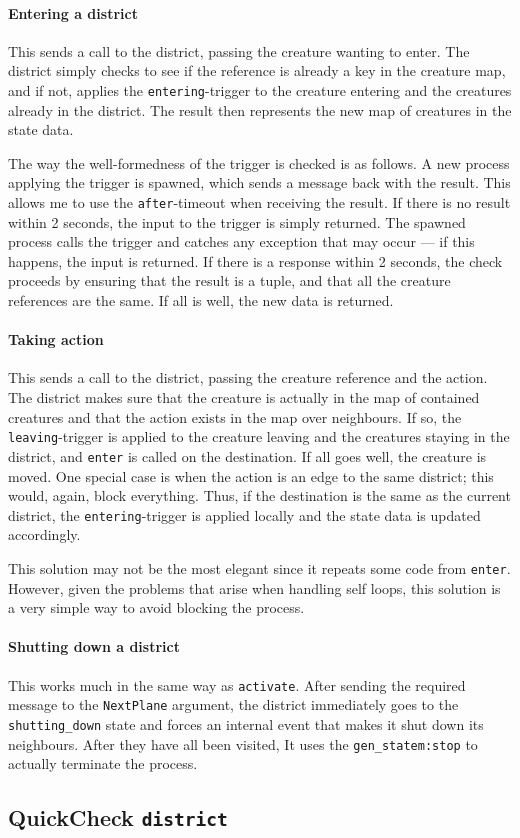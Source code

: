 \paragraph{Entering a district} This sends a call to the district, passing the creature wanting to enter. The district simply checks to see if the reference is already a key in the creature map, and if not, applies the \texttt{entering}-trigger to the creature entering and the creatures already in the district. The result then represents the  new map of creatures in the state data.

The way the well-formedness of the trigger is checked is as follows. A new process applying the trigger is spawned, which sends a message back with the result. This allows me to use the \texttt{after}-timeout when receiving the result. If there is no result within 2 seconds, the input to the trigger is simply returned. The spawned process calls the trigger and catches any exception that may occur --- if this happens, the input is returned. If there is a response within 2 seconds, the check proceeds by ensuring that the result is a tuple, and that all the creature references are the same. If all is well, the new data is returned.

\paragraph{Taking action} This sends a call to the district, passing the creature reference and the action. The district makes sure that the creature is actually in the map of contained creatures and that the action exists in the map over neighbours. If so, the \texttt{leaving}-trigger is applied to the creature leaving and the creatures staying in the district, and \texttt{enter} is called on the destination. If all goes well, the creature is moved. One special case is when the action is an edge to the same district; this would, again, block everything. Thus, if the destination is the same as the current district, the \texttt{entering}-trigger is applied locally and the state data is updated accordingly.

This solution may not be the most elegant since it repeats some code from \texttt{enter}. However, given the problems that arise when handling self loops, this solution is a very simple way to avoid blocking the process.

\paragraph{Shutting down a district} This works much in the same way as \texttt{activate}. After sending the required message to the \texttt{NextPlane} argument, the district immediately goes to the \texttt{shutting\_down} state and forces an internal event that makes it shut down its neighbours. After they have all been visited, It uses the \texttt{gen\_statem:stop} to actually terminate the process.


\subsection*{QuickCheck \texttt{district}}
